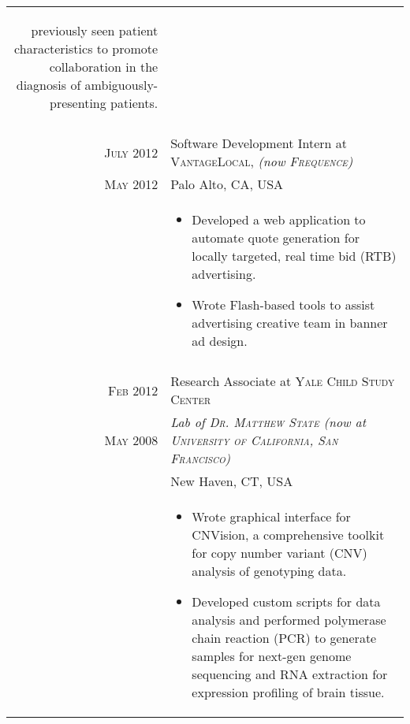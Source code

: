 \documentclass[a4paper,10pt]{article}
\begin{document}
\begin{longtable}{r|p{11cm}}
{\begin{itemize}
{previously seen patient characteristics to promote collaboration in the diagnosis
of ambiguously-presenting patients.
		}
	\end{itemize}
   }\\
 \multicolumn{2}{c}{} \\
 \nopagebreak \textsc{July 2012} & Software Development Intern at \textsc{VantageLocal}, \small\emph{(now \textsc{Frequence})}\\
 \nopagebreak \textsc{May 2012} & \small{Palo Alto, CA, USA}\\
 \nopagebreak & \footnotesize{
	\begin{itemize}
		\item[]{
			Developed a web application to automate quote generation for
			locally targeted, real time bid (RTB) advertising.
		}
		\item[]{
			Wrote Flash-based tools to assist advertising creative team
			in banner ad design.
		}
	\end{itemize}
   }\\
 \multicolumn{2}{c}{} \\
 \nopagebreak \textsc{Feb 2012} & Research Associate at \textsc{Yale Child Study Center} \\
 \nopagebreak \textsc{May 2008} & \small\emph{Lab of \textsc{Dr. Matthew State} (now at \textsc{University of California, San Francisco})} \\
 \nopagebreak & \small{New Haven, CT, USA} \\
 \nopagebreak & \footnotesize{
	\begin{itemize}
		\item[]{
			Wrote graphical interface for CNVision, a comprehensive toolkit for copy number
variant (CNV) analysis of genotyping data.
		}
		\item[]{
			Developed custom scripts for data analysis and performed polymerase chain
			reaction (PCR) to generate samples for next-gen genome sequencing and RNA
			extraction for expression profiling of brain tissue.
		}
	\end{itemize}
   }\\
\end{longtable}

\end{document}
